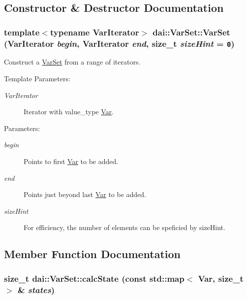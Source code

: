 \subsection{Constructor \& Destructor Documentation}
\hypertarget{classdai_1_1VarSet_85468ed9f66a25fbbd65ae44ccd49473}{
\subsubsection[VarSet]{\setlength{\rightskip}{0pt plus 5cm}template$<$typename VarIterator$>$ dai::VarSet::VarSet (VarIterator {\em begin}, \/  VarIterator {\em end}, \/  size\_\-t {\em sizeHint} = {\tt 0})}}
\label{classdai_1_1VarSet_85468ed9f66a25fbbd65ae44ccd49473}


Construct a \hyperlink{classdai_1_1VarSet}{VarSet} from a range of iterators. 

\begin{Desc}
\item[Template Parameters:]
\begin{description}
\item[{\em VarIterator}]Iterator with value\_\-type \hyperlink{classdai_1_1Var}{Var}. \end{description}
\end{Desc}
\begin{Desc}
\item[Parameters:]
\begin{description}
\item[{\em begin}]Points to first \hyperlink{classdai_1_1Var}{Var} to be added. \item[{\em end}]Points just beyond last \hyperlink{classdai_1_1Var}{Var} to be added. \item[{\em sizeHint}]For efficiency, the number of elements can be speficied by sizeHint. \end{description}
\end{Desc}


\subsection{Member Function Documentation}
\hypertarget{classdai_1_1VarSet_a6fd950faa6961c9786e96b04ee2dee1}{
\subsubsection[calcState]{\setlength{\rightskip}{0pt plus 5cm}size\_\-t dai::VarSet::calcState (const std::map$<$ {\bf Var}, size\_\-t $>$ \& {\em states})}}
\label{classdai_1_1VarSet_a6fd950faa6961c9786e96b04ee2dee1}


